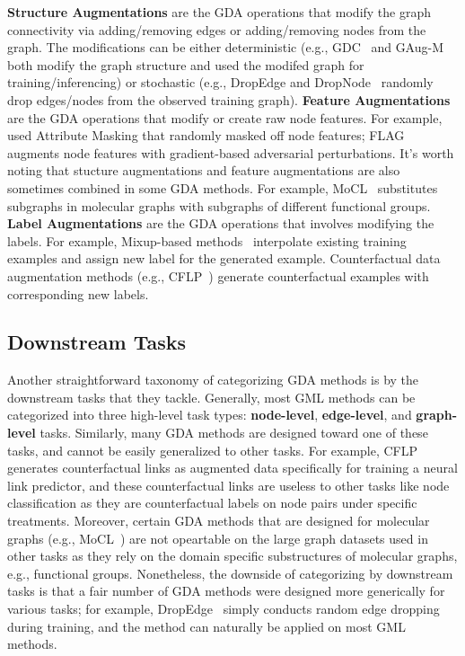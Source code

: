 \documentclass[11pt]{article}
\begin{document}
\textbf{Structure Augmentations} 
are the GDA operations that modify the graph connectivity via adding/removing edges or adding/removing nodes from the graph. The modifications can be either deterministic (e.g., GDC~\cite{klicpera2019diffusion} and GAug-M~\cite{zhao2021data} both modify the graph structure and used the modifed graph for training/inferencing) or stochastic (e.g., DropEdge\cite{rong2019dropedge} and DropNode~\cite{feng2020graph} randomly drop edges/nodes from the observed training graph). 
\textbf{Feature Augmentations} 
are the GDA operations that modify or create raw node features. For example, \citet{you2020graph} used Attribute Masking that randomly masked off node features; FLAG~\cite{kong2020flag} augments node features with gradient-based adversarial perturbations. It's worth noting that stucture augmentations and feature augmentations are also sometimes combined in some GDA methods. For example, MoCL~\cite{sun2021mocl} substitutes subgraphs in molecular graphs with subgraphs of different functional groups.
\textbf{Label Augmentations} 
are the GDA operations that involves modifying the labels. For example, Mixup-based methods~\cite{han2022G,guo2021intrusion} interpolate existing training examples and assign new label for the generated example. Counterfactual data augmentation methods (e.g., CFLP~\cite{zhao2021counterfactual}) generate counterfactual examples with corresponding new labels.

\subsection{Downstream Tasks}
Another straightforward taxonomy of categorizing GDA methods is by the downstream tasks that they tackle. Generally, most GML methods can be categorized into three high-level task types: \textbf{node-level}, \textbf{edge-level}, and \textbf{graph-level} tasks. 
Similarly, many GDA methods are designed toward one of these tasks, and cannot be easily generalized to other tasks. For example, CFLP~\cite{zhao2021counterfactual} generates counterfactual links as augmented data specifically for training a neural link predictor, and these counterfactual links are useless to other tasks like node classification as they are counterfactual labels on node pairs under specific treatments. Moreover, certain GDA methods that are designed for molecular graphs (e.g., MoCL~\cite{sun2021mocl}) are not opeartable on the large graph datasets used in other tasks as they rely on the domain specific substructures of molecular graphs, e.g., functional groups. Nonetheless, the downside of categorizing by downstream tasks is that a fair number of GDA methods were designed more generically for various tasks; for example, DropEdge~\cite{rong2019dropedge} simply conducts random edge dropping during training, and the method can naturally be applied on most GML methods.
\end{document}
